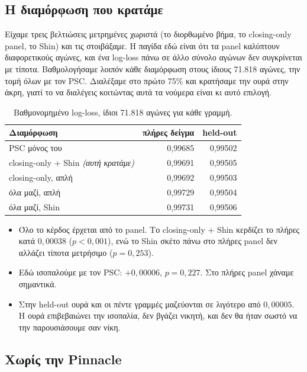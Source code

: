 \documentclass[11pt,a4paper]{article}
\renewcommand{\_}{\oldunderscore\allowbreak}
\begin{document}
\subsection*{Η διαμόρφωση που κρατάμε}

Είχαμε τρεις βελτιώσεις μετρημένες χωριστά (το διορθωμένο βήμα, το closing-only panel, το
Shin) και τις στοιβάξαμε. Η παγίδα εδώ είναι ότι τα panel καλύπτουν διαφορετικούς αγώνες,
και ένα log-loss πάνω σε άλλο σύνολο αγώνων δεν συγκρίνεται με τίποτα. Βαθμολογήσαμε λοιπόν
κάθε διαμόρφωση στους ίδιους 71.818 αγώνες, την τομή όλων με τον PSC. Διαλέξαμε στο πρώτο
75\% και κρατήσαμε την ουρά στην άκρη, γιατί το να διαλέγεις κοιτώντας αυτά τα νούμερα είναι
κι αυτό επιλογή.

\begin{table}[H]
\centering
\begin{tabular}{@{}lrr@{}}
\toprule
\textbf{Διαμόρφωση} & \textbf{πλήρες δείγμα} & \textbf{held-out} \\
\midrule
PSC μόνος του                             & 0,99685 & 0,99502 \\
closing-only + Shin \emph{(αυτή κρατάμε)} & 0,99691 & 0,99505 \\
closing-only, απλή                        & 0,99692 & 0,99503 \\
όλα μαζί, απλή                            & 0,99729 & 0,99504 \\
όλα μαζί, Shin                            & 0,99731 & 0,99506 \\
\bottomrule
\end{tabular}
\caption{Βαθμονομημένο log-loss, ίδιοι 71.818 αγώνες για κάθε γραμμή.}
\end{table}

\begin{itemize}
  \item Όλο το κέρδος έρχεται από το panel. Το closing-only $+$ Shin κερδίζει το πλήρες κατά
        $0{,}00038$ ($p<0{,}001$), ενώ το Shin σκέτο πάνω στο πλήρες panel δεν αλλάζει τίποτα
        μετρήσιμο ($p=0{,}253$).
  \item Εδώ ισοπαλούμε με τον PSC: $+0{,}00006$, $p=0{,}227$. Στο πλήρες panel χάναμε
        σημαντικά.
  \item Στην held-out ουρά και οι πέντε γραμμές μαζεύονται σε λιγότερο από $0{,}00005$. Η
        ουρά επιβεβαιώνει την ισοπαλία, δεν βγάζει νικητή, και δεν θα ήταν σωστό να την
        παρουσιάσουμε σαν νίκη.
\end{itemize}

\subsection*{Χωρίς την Pinnacle}
\end{document}
